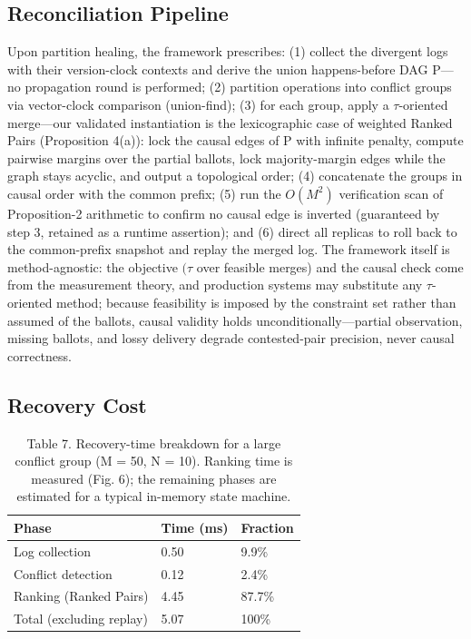 \documentclass[journal]{IEEEtran}
\begin{document}
\subsection{Reconciliation Pipeline}
Upon partition healing, the framework prescribes: (1) collect the divergent logs with their version-clock contexts and derive the union happens-before DAG P—no propagation round is performed; (2) partition operations into conflict groups via vector-clock comparison (union-find); (3) for each group, apply a $\tau$-oriented merge—our validated instantiation is the lexicographic case of weighted Ranked Pairs (Proposition 4(a)): lock the causal edges of P with infinite penalty, compute pairwise margins over the partial ballots, lock majority-margin edges while the graph stays acyclic, and output a topological order; (4) concatenate the groups in causal order with the common prefix; (5) run the $O(M^{2})$ verification scan of Proposition-2 arithmetic to confirm no causal edge is inverted (guaranteed by step 3, retained as a runtime assertion); and (6) direct all replicas to roll back to the common-prefix snapshot and replay the merged log. The framework itself is method-agnostic: the objective $(\tau$ over feasible merges) and the causal check come from the measurement theory, and production systems may substitute any $\tau$-oriented method; because feasibility is imposed by the constraint set rather than assumed of the ballots, causal validity holds unconditionally—partial observation, missing ballots, and lossy delivery degrade contested-pair precision, never causal correctness.

\subsection{Recovery Cost}
\begin{table}[t]
\centering
\caption{Table 7. Recovery-time breakdown for a large conflict group (M = 50, N = 10). Ranking time is measured (Fig. 6); the remaining phases are estimated for a typical in-memory state machine.}
\begin{tabular}{lll}
\hline
Phase & Time (ms) & Fraction \\
\hline
Log collection & 0.50 & 9.9\% \\
Conflict detection & 0.12 & 2.4\% \\
Ranking (Ranked Pairs) & 4.45 & 87.7\% \\
Total (excluding replay) & 5.07 & 100\% \\
\hline
\end{tabular}
\end{table}
\end{document}

